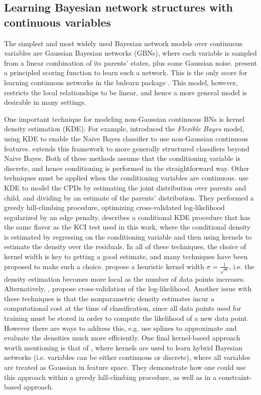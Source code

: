 \documentclass{article} %
\begin{document}
\subsection{Learning Bayesian network structures with continuous variables}
The simplest and most widely used Bayesian network models over continuous variables are Gaussian Bayesian networks (GBNs), where each variable is sampled from a linear combination of its parents' states, plus some Gaussian noise.  \cite{geiger1994learning} present a principled scoring function to learn such a network.  This is the only score for learning continuous networks in the bnlearn package \cite{scutari2009learning}.  This model, however, restricts the local relationships to be linear, and hence a more general model is desirable in many settings.

One important technique for modeling non-Gaussian continuous BNs is kernel density estimation (KDE).  For example, \cite{john1995estimating} introduced the {\it Flexible Bayes} model, using KDE to enable the Naive Bayes classifier to use non-Gaussian continuous features.  \cite{perez2009bayesian} extends this framework to more generally structured classifiers beyond Naive Bayes.  Both of these methods assume that the conditioning variable is discrete, and hence conditioning is performed in the straightforward way.  Other techniques must be applied when the conditioning variables are continuous.  \cite{hofmann1996discovering} use KDE to model the CPDs by estimating the joint distribution over parents and child, and dividing by an estimate of the parents' distribution.  They performed a greedy hill-climbing procedure, optimizing cross-validated log-likelihood regularized by an edge penalty.  \cite{hansen2004nonparametric} describes a conditional KDE procedure that has the same flavor as the KCI test used in this work, where the conditional density is estimated by regressing on the conditioning variable and then using kernels to estimate the density over the residuals.  In all of these techniques, the choice of kernel width is key to getting a good estimate, and many techniques have been proposed to make such a choice.  \cite{john1995estimating} propose a heuristic kernel width $\sigma = \frac{1}{\sqrt n}$, i.e. the density estimation becomes more local as the number of data points increases.  Alternatively, \cite{holmes2012fast}, propose cross-validation of the log-likelihood.  Another issue with these techniques is that the nonparametric density estimates incur a computational cost at the time of classification, since all data points used for training must be stored in order to compute the likelihood of a new data point.  However there are ways to address this, e.g. \cite{gurwicz2004rapid} use splines to approximate and evaluate the densities much more efficiently.  One final kernel-based approach worth mentioning is that of \cite{bach2002learning}, where kernels are used to learn hybrid Bayesian networks (i.e. variables can be either continuous or discrete), where all variables are treated as Gaussian in feature space.  They demonstrate how one could use this approach within a greedy hill-climbing procedure, as well as in a constraint-based approach.
\end{document}
